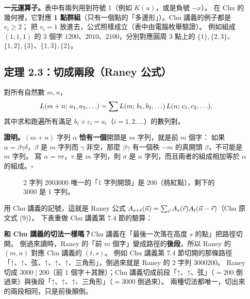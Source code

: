 \textbf{一元運算子。}表中有兩列用到符號 1（例如 $K(u)$，或是負號 $-x$）。
在 Chu 的幾何裡，它對應 \textbf{1 點群組}（只有一個點的「多邊形」）。Chu 講義的例子都是 $v_i\ge2$；
把 $v_i=1$ 放進去，公式照樣成立（表中由電腦枚舉驗證）。
例如組成 $(1;1,1)$ 的 3 個字 $1200$、$2010$、$2100$，分別對應圓周 3 點上的
$\{1\},\{2,3\}$、$\{1,2\},\{3\}$、$\{1,3\},\{2\}$。

\subsection{定理 2.3：切成兩段（Raney 公式）}

\begin{thmbox}[定理 2.3 \paper{p.~444}]
對所有自然數 $m,n$，
\[
L(m+n;\,a_1,a_2,\ldots)=\sum L(m;\,b_1,b_2,\ldots)\,L(n;\,c_1,c_2,\ldots),
\]
其中求和跑遍所有滿足 $b_i+c_i=a_i$（$i=1,2,\ldots$）的數列對。
\end{thmbox}

\textbf{證明。}$(m+n)$ 字列 $\alpha$ \textbf{恰有一個}開頭是 $m$ 字列，就是前 $m$ 個字：
如果 $\alpha=\beta\gamma\delta$，$\beta$ 是 $m$ 字列而 $\gamma$ 非空，那麼 $\beta\gamma$ 有一個秩 $-m$ 的真開頭 $\beta$，不可能是 $m$ 字列。
寫 $\alpha=\tau\sigma$，$\tau$ 是 $m$ 字列，則 $\sigma$ 是 $n$ 字列，而且兩者的組成相加等於 $\alpha$ 的組成。\hfill$\square$

\begin{figure}[H]
\centering
\RanThmTwoThree
\caption{2 字列 $2003000$ 唯一的「1 字列開頭」是 $200$（桃紅點），剩下的 $3000$ 是 1 字列。}
\label{fig:thm23}
\end{figure}

用 Chu 講義的記號，這就是 Raney 公式 $A_{s+t}(\vec n)=\sum_{\vec r}A_s(\vec r)A_t(\vec n-\vec r)$（Chu 原文式 (9)）。
下表重做 Chu 講義第 7.4 節的驗算：

\begin{table}[H]
\centering
\RanThmTwoThreeTable
\caption{$\RL{2}{0,1,1}=12$ 依「第一個字的組成 $b$」分組，$5+1+1+5=12$。}
\end{table}

\textbf{和 Chu 講義的切法一樣嗎？}Chu 講義在「最後一次落在高度 $s$ 的點」把路徑切開。
倒過來讀時，Raney 的「前 $m$ 個字」變成路徑的\textbf{後段}，所以 Raney 的 $(m,n)$ 對應 Chu 講義的 $(t,s)$。
例如 Chu 講義第 7.4 節切開的那條路徑「↑、↑、弦、↑、↑、↑、三角形」，倒過來就是 Raney 的 2 字列 $3000200$。
Raney 切成 $3000\mid200$（前 1 個字＋其餘）；Chu 講義切成前段「↑、↑、弦」（$=200$ 倒過來）與後段「↑、↑、↑、三角形」（$=3000$ 倒過來）。
兩種切法都唯一，切出來的兩段相同，只是前後顛倒。

